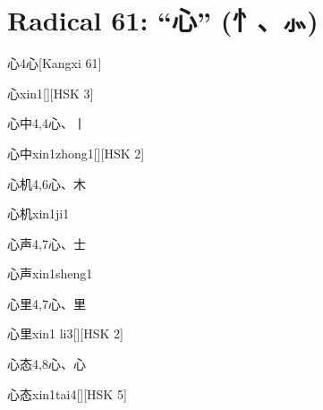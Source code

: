 
\section*{Radical 61: ``⼼'' (忄、⺗)}

\begin{entry}{心}{4}{⼼}[Kangxi 61]
  \begin{phonetics}{心}{xin1}[][HSK 3]
  \end{phonetics}
\end{entry}

\begin{entry}{心中}{4,4}{⼼、⼁}
  \begin{phonetics}{心中}{xin1zhong1}[][HSK 2]
  \end{phonetics}
\end{entry}

\begin{entry}{心机}{4,6}{⼼、⽊}
  \begin{phonetics}{心机}{xin1ji1}
  \end{phonetics}
\end{entry}

\begin{entry}{心声}{4,7}{⼼、⼠}
  \begin{phonetics}{心声}{xin1sheng1}
  \end{phonetics}
\end{entry}

\begin{entry}{心里}{4,7}{⼼、⾥}
  \begin{phonetics}{心里}{xin1 li3}[][HSK 2]
  \end{phonetics}
\end{entry}

\begin{entry}{心态}{4,8}{⼼、⼼}
  \begin{phonetics}{心态}{xin1tai4}[][HSK 5]
  \end{phonetics}
\end{entry}

